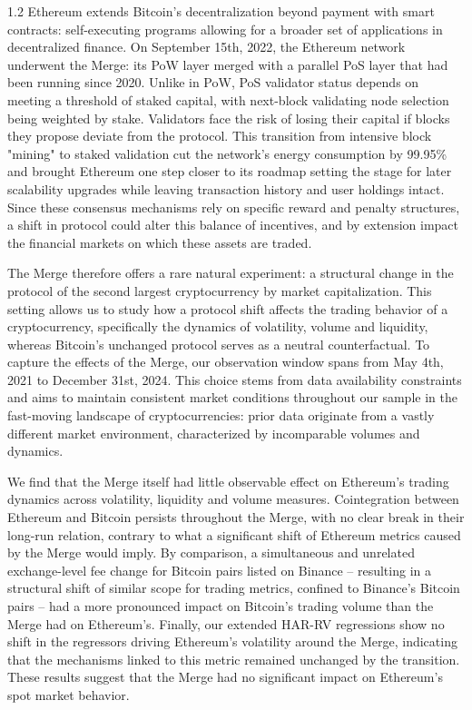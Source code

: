 \documentclass[10pt]{article}
\begin{document}
\begin{setstretch}{1.2}
Ethereum extends Bitcoin's decentralization beyond payment with smart contracts: self-executing programs allowing for a broader set of applications in decentralized finance. On September 15th, 2022, the Ethereum network underwent the Merge: its PoW layer merged with a parallel PoS layer that had been running since 2020. Unlike in PoW, PoS validator status depends on meeting a threshold of staked capital, with next-block validating node selection being weighted by stake. Validators face the risk of losing their capital if blocks they propose deviate from the protocol. This transition from intensive block "mining" to staked validation cut the network's energy consumption by 99.95\% and brought Ethereum one step closer to its roadmap setting the stage for later scalability upgrades while leaving transaction history and user holdings intact. Since these consensus mechanisms rely on specific reward and penalty structures, a shift in protocol could alter this balance of incentives, and by extension impact the financial markets on which these assets are traded.

The Merge therefore offers a rare natural experiment: a structural change in the protocol of the second largest cryptocurrency by market capitalization. This setting allows us to study how a protocol shift affects the trading behavior of a cryptocurrency, specifically the dynamics of volatility, volume and liquidity, whereas Bitcoin's unchanged protocol serves as a neutral counterfactual. To capture the effects of the Merge, our observation window spans from May 4th, 2021 to December 31st, 2024. This choice stems from data availability constraints and aims to maintain consistent market conditions throughout our sample in the fast-moving landscape of cryptocurrencies: prior data originate from a vastly different market environment, characterized by incomparable volumes and dynamics.

We find that the Merge itself had little observable effect on Ethereum's trading dynamics across volatility, liquidity and volume measures. Cointegration between Ethereum and Bitcoin persists throughout the Merge, with no clear break in their long-run relation, contrary to what a significant shift of Ethereum metrics caused by the Merge would imply. By comparison, a simultaneous and unrelated exchange-level fee change for Bitcoin pairs listed on Binance -- resulting in a structural shift of similar scope for trading metrics, confined to Binance's Bitcoin pairs -- had a more pronounced impact on Bitcoin's trading volume than the Merge had on Ethereum's. Finally, our extended HAR-RV regressions show no shift in the regressors driving Ethereum's volatility around the Merge, indicating that the mechanisms linked to this metric remained unchanged by the transition. These results suggest that the Merge had no significant impact on Ethereum's spot market behavior. 


\end{setstretch}
\end{document}
